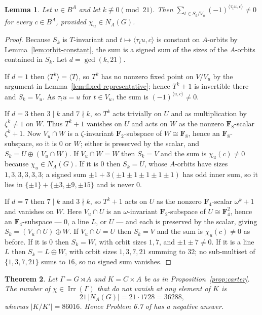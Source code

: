 \documentclass[11pt,a4paper,reqno]{amsart}
\newtheorem{theorem}{Theorem}[section]
\newtheorem{lemma}[theorem]{Lemma}
\theoremstyle{definition}
\theoremstyle{remark}
\newcommand{\F}{\mathbf F}
\newcommand{\Irr}{\operatorname{Irr}}
\begin{document}
\begin{lemma}\label{lem:k-nonzero}
Let $u\in B^A$ and let $k\not\equiv0\pmod{21}$.  Then
$\sum_{t\in S_k/V_u}(-1)^{\langle\tau_tu,c\rangle}\neq0$ for every
$c\in B^A$, provided $\chi_u\in N_A(G)$.
\end{lemma}

\begin{proof}
Because $S_k$ is $T$-invariant and $t\mapsto\langle\tau_tu,c\rangle$ is
constant on $A$-orbits by Lemma~\ref{lem:orbit-constant}, the sum is a
signed sum of the sizes of the $A$-orbits contained in $S_k$.  Let
$d=\gcd(k,21)$.

If $d=1$ then $\langle T^k\rangle=\langle T\rangle$, so $T^k$ has no
nonzero fixed point on $V/V_u$ by the argument in
Lemma~\ref{lem:fixed-representative}; hence $T^k+1$ is invertible there
and $S_k=V_u$.  As $\tau_tu=u$ for $t\in V_u$, the sum is
$(-1)^{\langle u,c\rangle}\neq0$.

If $d=3$ then $3\mid k$ and $7\nmid k$, so $T^k$ acts trivially on $U$
and as multiplication by $\zeta^k\neq1$ on $W$.  Thus $T^k+1$ vanishes
on $U$ and acts on $W$ as the nonzero $\F_8$-scalar $\zeta^k+1$.  Now
$V_u\cap W$ is a $\zeta$-invariant $\F_2$-subspace of $W\cong\F_8$,
hence an $\F_8$-subspace, so it is $0$ or $W$; either is preserved by
the scalar, and $S_k=U\oplus(V_u\cap W)$.  If $V_u\cap W=W$ then
$S_k=V$ and the sum is
$\chi_u(c)\neq0$ because $\chi_u\in N_A(G)$.  If it is $0$ then $S_k=U$,
whose $A$-orbits have sizes $1,3,3,3,3,3$; a signed sum
$\pm1+3(\pm1\pm1\pm1\pm1\pm1)$ has odd inner sum, so it lies in
$\{\pm1\}+\{\pm3,\pm9,\pm15\}$ and is never $0$.

If $d=7$ then $7\mid k$ and $3\nmid k$, so $T^k+1$ acts on $U$ as the
nonzero $\F_4$-scalar $\omega^k+1$ and vanishes on $W$.  Here
$V_u\cap U$ is an $\omega$-invariant $\F_2$-subspace of
$U\cong\F_4^2$, hence an $\F_4$-subspace --- $0$, a line $L$, or
$U$ --- and each is preserved by the scalar, giving
$S_k=(V_u\cap U)\oplus W$.  If $V_u\cap U=U$ then $S_k=V$ and the sum
is
$\chi_u(c)\neq0$ as before.  If it is $0$ then $S_k=W$, with orbit sizes
$1,7$, and $\pm1\pm7\neq0$.  If it is a line $L$ then $S_k=L\oplus W$,
with orbit sizes $1,3,7,21$ summing to $32$; no sub-multiset of
$\{1,3,7,21\}$ sums to $16$, so no signed sum vanishes.
\end{proof}

\begin{theorem}\label{thm:carter}
Let $\Gamma=G\rtimes A$ and $K=C\times A$ be as in
Proposition~\ref{prop:carter}.  The number of $\chi\in\Irr(\Gamma)$ that
do not vanish at any element of $K$ is
\[
 21\,|N_A(G)|=21\cdot1728=36288,
\]
whereas $|K/K'|=86016$.  Hence Problem 6.7 of \cite{navarro-problems}
has a negative answer.
\end{theorem}
\end{document}
